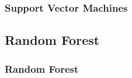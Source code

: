 \documentclass[10pt]{beamer}
\begin{document}
\begin{frame}
	\frametitle{Support Vector Machines}
	\begin{figure}[htbp]
		\centering
		\qquad\quad
	\end{figure}
\end{frame}

\subsection{Random Forest}

\begin{frame}
	\frametitle{Random Forest}
	\begin{figure}[htbp]
		\centering
		\qquad\quad
	\end{figure}
\end{frame}
\end{document}
